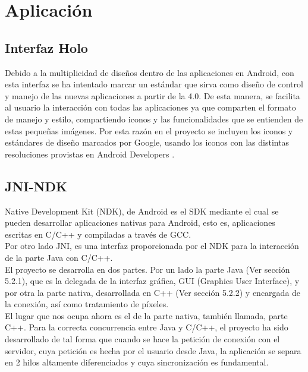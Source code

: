 \section{Aplicación}

\subsection{Interfaz Holo}

Debido a la multiplicidad de diseños dentro de las aplicaciones en Android, con esta interfaz se ha intentado marcar un estándar que sirva como diseño de control y manejo de las nuevas aplicaciones a partir de la 4.0. De esta manera, se facilita al usuario la interacción con todas las aplicaciones ya que comparten el formato de manejo y estilo, compartiendo iconos y las funcionalidades que se entienden de estas pequeñas imágenes. Por esta razón en el proyecto se incluyen los iconos y estándares de diseño marcados por Google, usando los iconos con las distintas resoluciones provistas en Android Developers \cite{holo:holo}.

\subsection{JNI-NDK}
Native Development Kit (NDK), de Android es el SDK mediante el cual se pueden desarrollar aplicaciones nativas para Android, esto es, aplicaciones escritas en C/C++ y compiladas a través de GCC.\\

Por otro lado JNI, es una interfaz proporcionada por el NDK para la interacción de la parte Java con C/C++.\\

El proyecto se desarrolla en dos partes. Por un lado la parte Java (Ver sección 5.2.1), que es la delegada de la interfaz gráfica, GUI (Graphics User Interface), y por otra la parte nativa, desarrollada en C++ (Ver sección 5.2.2) y encargada de la conexión, así como tratamiento de píxeles.\\

El lugar que nos ocupa ahora es el de la parte nativa, también llamada, parte C++. Para la correcta concurrencia entre Java y C/C++, el proyecto ha sido desarrollado de tal forma que cuando se hace la petición de conexión con el servidor, cuya petición es hecha por el usuario desde Java, la aplicación se separa en 2 hilos altamente diferenciados y cuya sincronización es fundamental.\\

